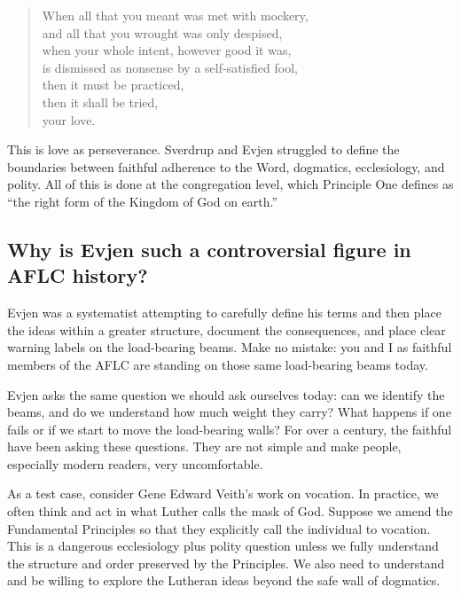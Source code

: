 \begin{quote}
When all that you meant was met with mockery,\\
and all that you wrought was only despised,\\
when your whole intent, however good it was,\\
is dismissed as nonsense by a self-satisfied fool,\\
then it must be practiced,\\
then it shall be tried,\\
your love.\\
\end{quote}

This is love as perseverance. Sverdrup and Evjen struggled to define the boundaries between faithful adherence to the Word, dogmatics, ecclesiology, and polity. All of this is done at the congregation level, which Principle One defines as ``the right form of the Kingdom of God on earth.''


\subsection{Why is Evjen such a controversial figure in AFLC history?}

Evjen was a systematist attempting to carefully define his terms and then place the ideas within a greater structure, document the consequences, and place clear warning labels on the load-bearing beams. Make no mistake: you and I as faithful members of the AFLC are standing on those same load-bearing beams today.

Evjen asks the same question we should ask ourselves today: can we identify the beams, and do we understand how much weight they carry? What happens if one fails or if we start to move the load-bearing walls? For over a century, the faithful have been asking these questions. They are not simple and make people, especially modern readers, very uncomfortable. 

As a test case, consider Gene Edward Veith's work on vocation. In practice, we often think and act in what Luther calls the mask of God. Suppose we amend the Fundamental Principles so that they explicitly call the individual to vocation. This is a dangerous ecclesiology plus polity question unless we fully understand the structure and order preserved by the Principles. We also need to understand and be willing to explore the Lutheran ideas beyond the safe wall of dogmatics. 


